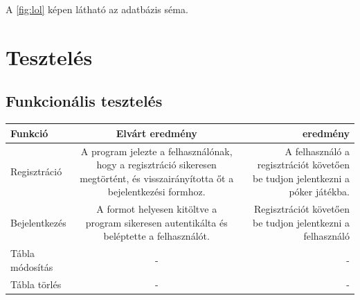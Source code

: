 
A \ref{fig:lol} képen látható az adatbázis séma.
\section{Tesztelés}
\subsection{Funkcionális tesztelés}
\begin{tabular}{| l | c | r |}
\hline
  Funkció & Elvárt eredmény & eredmény \\ \hline
  Regisztráció & A program jelezte a felhasználónak, hogy a regisztráció sikeresen megtörtént, és visszairányította őt a bejelentkezési formhoz. & A felhasználó a regisztrációt követően be tudjon jelentkezni a póker játékba. \\ \hline
  Bejelentkezés & A formot helyesen kitöltve a program sikeresen autentikálta és beléptette a felhasználót. & Regisztrációt követően be tudjon jelentkezni a felhasználó \\ \hline
  Tábla módosítás & - & - \\ \hline
  Tábla törlés & - & - \\ \hline
\end{tabular}

\clearpage
